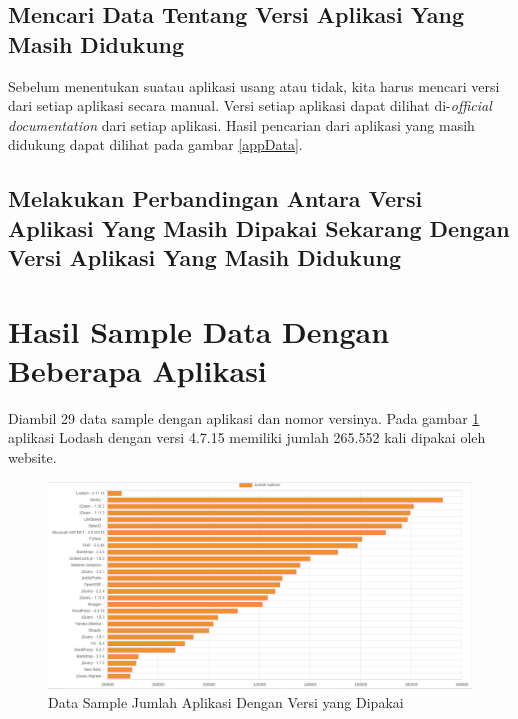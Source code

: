 \subsection{Mencari Data Tentang Versi Aplikasi Yang Masih Didukung}
Sebelum menentukan suatau aplikasi usang atau tidak, kita harus mencari versi dari setiap aplikasi secara manual. Versi setiap aplikasi dapat dilihat di-\textit{official documentation} dari setiap aplikasi. Hasil pencarian dari aplikasi yang masih didukung dapat dilihat pada gambar \ref{appData}. 

\subsection{Melakukan Perbandingan Antara Versi Aplikasi Yang Masih Dipakai Sekarang Dengan Versi Aplikasi Yang Masih Didukung}




\section{Hasil Sample Data Dengan Beberapa Aplikasi}
Diambil 29 data sample dengan aplikasi dan nomor versinya. Pada gambar \ref{fig:data_sample_res} aplikasi Lodash dengan versi 4.7.15 memiliki jumlah 265.552 kali dipakai oleh website.
\begin{figure}[H]
\centering  
\includegraphics[scale=0.5]{Gambar/hasil_chart_all.PNG}  
\caption{Data Sample Jumlah Aplikasi Dengan Versi yang Dipakai} 
\label{fig:data_sample_res} 
\end{figure}